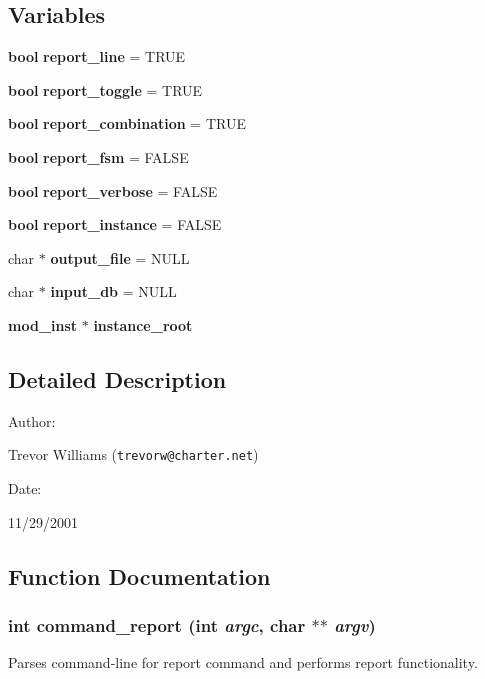 \subsection*{Variables}
\begin{CompactItemize}
\item 
{\bf bool} {\bf report\_\-line} = TRUE
\item 
{\bf bool} {\bf report\_\-toggle} = TRUE
\item 
{\bf bool} {\bf report\_\-combination} = TRUE
\item 
{\bf bool} {\bf report\_\-fsm} = FALSE
\item 
{\bf bool} {\bf report\_\-verbose} = FALSE
\item 
{\bf bool} {\bf report\_\-instance} = FALSE
\item 
char $\ast$ {\bf output\_\-file} = NULL
\item 
char $\ast$ {\bf input\_\-db} = NULL
\item 
{\bf mod\_\-inst} $\ast$ {\bf instance\_\-root}
\end{CompactItemize}


\subsection{Detailed Description}


\begin{Desc}
\item[Author: ]\par
Trevor Williams ({\tt trevorw@charter.net}) \end{Desc}
\begin{Desc}
\item[Date: ]\par
11/29/2001\end{Desc}


\subsection{Function Documentation}
\subsubsection{\setlength{\rightskip}{0pt plus 5cm}int command\_\-report (int {\em argc}, char $\ast$$\ast$ {\em argv})}\label{report_8c_a14}


Parses command-line for report command and performs report functionality.

